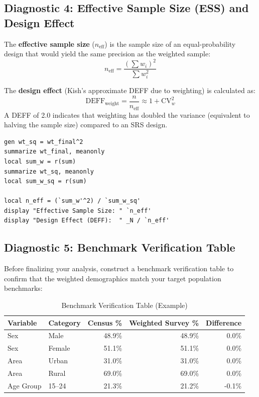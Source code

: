 \documentclass[11pt,a4paper]{article}
\begin{document}
\subsection{Diagnostic 4: Effective Sample Size (ESS) and Design Effect}
The \textbf{effective sample size} ($n_{\text{eff}}$) is the sample size of an equal-probability design that would yield the same precision as the weighted sample:
\begin{equation}
  n_{\text{eff}} = \frac{\left(\sum w_i\right)^2}{\sum w_i^2}
\end{equation}

The \textbf{design effect} (Kish's approximate DEFF due to weighting) is calculated as:
\begin{equation}
  \text{DEFF}_{\text{weight}} = \frac{n}{n_{\text{eff}}} \approx 1 + \text{CV}_w^2
\end{equation}
A DEFF of 2.0 indicates that weighting has doubled the variance (equivalent to halving the sample size) compared to an SRS design.

\begin{lstlisting}[style=stata, caption={Calculating ESS in Stata}]
gen wt_sq = wt_final^2
summarize wt_final, meanonly
local sum_w = r(sum)
summarize wt_sq, meanonly
local sum_w_sq = r(sum)

local n_eff = (`sum_w'^2) / `sum_w_sq'
display "Effective Sample Size: " `n_eff'
display "Design Effect (DEFF):  " _N / `n_eff'
\end{lstlisting}

\newpage

\subsection{Diagnostic 5: Benchmark Verification Table}
Before finalizing your analysis, construct a benchmark verification table to confirm that the weighted demographics match your target population benchmarks:

\begin{table}[htbp]
  \centering
  \caption{Benchmark Verification Table (Example)}
  \label{tab:benchmark_verification}
  \begin{tabular}{llrrr}
    \toprule
    \textbf{Variable} & \textbf{Category} & \textbf{Census \%} & \textbf{Weighted Survey \%} & \textbf{Difference} \\
    \midrule
    Sex & Male & 48.9\% & 48.9\% & 0.0\% \\
    Sex & Female & 51.1\% & 51.1\% & 0.0\% \\
    Area & Urban & 31.0\% & 31.0\% & 0.0\% \\
    Area & Rural & 69.0\% & 69.0\% & 0.0\% \\
    Age Group & 15--24 & 21.3\% & 21.2\% & -0.1\% \\
    \bottomrule
  \end{tabular}
\end{table}
\end{document}
